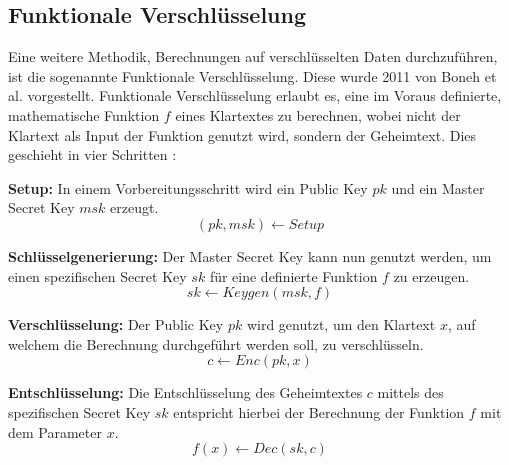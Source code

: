\subsection{Funktionale Verschlüsselung}\label{sec:funktionale_verschlüsselung}

Eine weitere Methodik, Berechnungen auf verschlüsselten Daten durchzuführen, ist die sogenannte Funktionale Verschlüsselung.
Diese wurde 2011 von Boneh et al. \cite{P-44} vorgestellt.
Funktionale Verschlüsselung erlaubt es, eine im Voraus definierte, mathematische Funktion $f$ eines Klartextes zu berechnen, wobei nicht der Klartext als Input der Funktion genutzt wird, sondern der Geheimtext.
Dies geschieht in vier Schritten \cite{P-44}:
\begin{compactenum}
    \item \textbf{Setup: } In einem Vorbereitungsschritt wird ein Public Key $pk$ und ein Master Secret Key $msk$ erzeugt.
    \begin{equation*}
        (pk, msk) \xleftarrow{} Setup
    \end{equation*}
    \item \textbf{Schlüsselgenerierung: } Der Master Secret Key kann nun genutzt werden, um einen spezifischen Secret Key $sk$ für eine definierte Funktion $f$ zu erzeugen.
    \begin{equation*}
        sk \xleftarrow{} Keygen(msk, f)
    \end{equation*}
    \item \textbf{Verschlüsselung: } Der Public Key $pk$ wird genutzt, um den Klartext $x$, auf welchem die Berechnung durchgeführt werden soll, zu verschlüsseln.
    \begin{equation*}
        c \xleftarrow{} Enc(pk,x)
    \end{equation*}
    \item \textbf{Entschlüsselung: } Die Entschlüsselung des Geheimtextes $c$ mittels des spezifischen Secret Key $sk$ entspricht hierbei der Berechnung der Funktion $f$ mit dem Parameter $x$.
    \begin{equation*}
        f(x) \xleftarrow{} Dec(sk,c)
    \end{equation*}
\end{compactenum}

